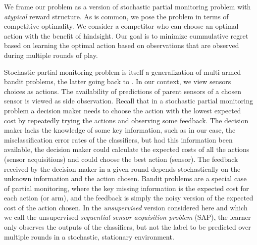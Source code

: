 

We frame our problem as a version of stochastic partial monitoring problem \citep{BaFoPaRaSze14} with \emph{atypical} reward structure. As is common, we pose the problem in terms of competitive optimality. We consider a competitor who can choose an optimal action with the benefit of hindsight. Our goal is to minimize cummulative regret based on learning the optimal action based on observations that are observed during multiple rounds of play.


Stochastic partial monitoring problem is itself a generalization of multi-armed bandit problems, the latter going back to \citet{Tho33}. In our context, we view sensors choices as actions. The availability of predictions of parent sensors of a chosen sensor is viewed as side observation.  Recall that in a stochastic partial monitoring problem a decision maker needs to choose the action with the lowest expected cost by repeatedly trying the actions and observing some feedback.
The decision maker lacks the knowledge of some key information, such as in our case, the misclassification
error rates of the classifiers, but had this information been available, the decision maker could calculate the
expected costs of all the actions (sensor acquisitions) and could choose the best action (sensor). The feedback received by the decision maker in a given round depends stochastically on the unknown information and the action chosen.
Bandit problems are a special case of partial monitoring, where the key missing information is the expected
cost for each action (or arm), and the feedback is simply the noisy version of the expected cost of the action chosen.
In the \emph{unsupervised} version considered here
and which we call the unsupervised \emph{sequential sensor acquisition problem} (SAP),
the learner only observes the outputs of the classifiers, but not the label to be predicted over multiple rounds
in a stochastic, stationary environment. 


